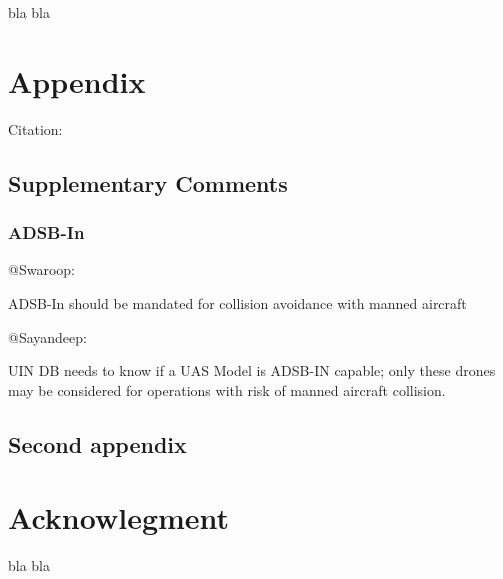 \documentclass{ua_wgs_base}
\begin{document}
bla bla

\chapter{Appendix}

Citation: \cite{IEEEexample:beebe_archive,taleb:2012,bringhurst:2002}

\section{Supplementary Comments}

\subsection{ADSB-In}

\begin{lyxgreyedout}
@Swaroop:%
\end{lyxgreyedout}
ADSB-In should be mandated for collision avoidance with manned aircraft

\begin{lyxgreyedout}
@Sayandeep:%
\end{lyxgreyedout}
UIN DB needs to know if a UAS Model is ADSB-IN capable; only these
drones may be considered for operations with risk of manned aircraft
collision.

\section{Second appendix}

\chapter*{Acknowlegment}

bla bla



\end{document}

